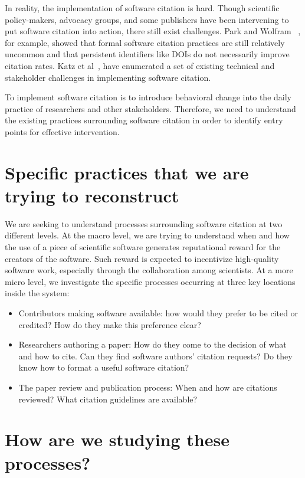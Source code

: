 \documentclass[sigchi-a,screen]{acmart}
\begin{document}
In reality, the implementation of software citation is hard. Though scientific policy-makers, advocacy groups, and some publishers have been intervening to put software citation into action, there still exist challenges. Park and Wolfram ~\cite{park2019research}, for example, showed that formal software citation practices are still relatively uncommon and that persistent identifiers like DOIs do not necessarily improve citation rates. Katz et al~\cite{katz2019software}, have enumerated a set of existing technical and stakeholder challenges in implementing software citation.

To implement software citation is to introduce behavioral change into the daily practice of researchers and other stakeholders. Therefore, we need to understand the existing practices surrounding software citation in order to identify entry points for effective intervention.

\section{Specific practices that we are trying to reconstruct}

We are seeking to understand processes surrounding software citation at two different levels. At the macro level, we are trying to understand when and how the use of a piece of scientific software generates reputational reward for the creators of the software. Such reward is expected to incentivize high-quality software work, especially through the collaboration among scientists. At a more micro level, we investigate the specific processes occurring at three key locations inside the system:

\begin{itemize}
    \item Contributors making software available: how would they prefer to be cited or credited? How do they make this preference clear?
    \item Researchers authoring a paper: How do they come to the decision of what and how to cite. Can they find software authors' citation requests? Do they know how to format a useful software citation?
    \item The paper review and publication process: When and how are citations reviewed? What citation guidelines are available?
\end{itemize}

\section{How are we studying these processes?}
\end{document}
